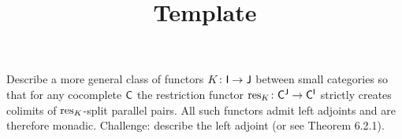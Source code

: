 \documentclass[../../solutions]{subfiles}
\title{Template}
\author{}
\begin{document}
\maketitle

%   

\begin{exercise}
  Describe a more general class of functors ${K}\colon{{\mathsf{I}}}\to{{\mathsf{J}}}$
  between small categories so that for any cocomplete ${\mathsf{C}}$ the
  restriction functor ${\operatorname{res}_K}\colon{{\mathsf{C}}^{\mathsf{J}}}\to{{\mathsf{C}}^{\mathsf{I}}}$ strictly
  creates colimits of $\operatorname{res}_K$-split parallel pairs.  All such
  functors admit left adjoints and are therefore monadic.  Challenge:
  describe the left adjoint (or see Theorem 6.2.1).
\end{exercise}
\end{document}

